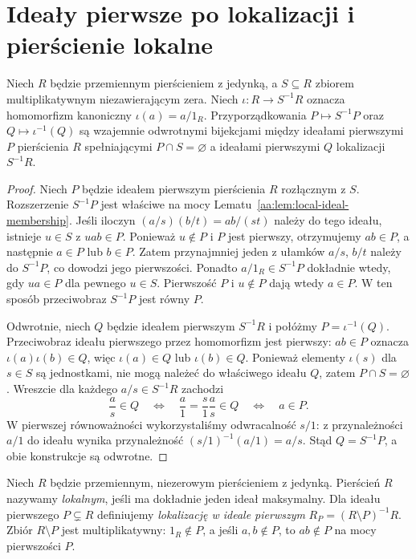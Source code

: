 \section{Ideały pierwsze po lokalizacji i pierścienie lokalne}
\begin{twierdzenie}
\label{aa:tw:prime-local-correspondence}
Niech $R$ będzie przemiennym pierścieniem z jedynką,
a $S\subseteq R$ zbiorem multiplikatywnym niezawierającym zera.
Niech $\iota:R\to S^{-1}R$ oznacza homomorfizm
kanoniczny $\iota(a)=a/1_R$. Przyporządkowania
$P\mapsto S^{-1}P$ oraz $Q\mapsto\iota^{-1}(Q)$
są wzajemnie odwrotnymi
bijekcjami między ideałami pierwszymi $P$ pierścienia $R$
spełniającymi $P\cap S=\varnothing$ a ideałami
pierwszymi $Q$ lokalizacji $S^{-1}R$.
\end{twierdzenie}
\begin{proof}
Niech $P$ będzie ideałem pierwszym pierścienia $R$
rozłącznym z $S$. Rozszerzenie $S^{-1}P$ jest właściwe
na mocy Lematu~\ref{aa:lem:local-ideal-membership}.
Jeśli iloczyn $(a/s)(b/t)=ab/(st)$ należy do tego
ideału, istnieje $u\in S$ z $uab\in P$.
Ponieważ $u\notin P$ i $P$ jest pierwszy, otrzymujemy
$ab\in P$, a następnie $a\in P$ lub $b\in P$.
Zatem przynajmniej jeden z ułamków $a/s$, $b/t$
należy do $S^{-1}P$, co dowodzi jego pierwszości.
Ponadto $a/1_R\in S^{-1}P$ dokładnie wtedy,
gdy $ua\in P$ dla pewnego $u\in S$.
Pierwszość $P$ i $u\notin P$ dają wtedy $a\in P$.
W ten sposób przeciwobraz $S^{-1}P$ jest równy $P$.

Odwrotnie, niech $Q$ będzie ideałem pierwszym $S^{-1}R$
i połóżmy $P=\iota^{-1}(Q)$. Przeciwobraz ideału
pierwszego przez homomorfizm jest pierwszy:
$ab\in P$ oznacza $\iota(a)\iota(b)\in Q$, więc
$\iota(a)\in Q$ lub $\iota(b)\in Q$.
Ponieważ elementy $\iota(s)$ dla $s\in S$ są jednostkami,
nie mogą należeć do właściwego ideału $Q$, zatem
$P\cap S=\varnothing$.
Wreszcie dla każdego $a/s\in S^{-1}R$ zachodzi
\[
 \frac as\in Q
 \quad\Longleftrightarrow\quad
 \frac a1=\frac s1\frac as\in Q
 \quad\Longleftrightarrow\quad a\in P.
\]
W pierwszej równoważności wykorzystaliśmy odwracalność
$s/1$: z przynależności $a/1$ do ideału wynika
przynależność $(s/1)^{-1}(a/1)=a/s$.
Stąd $Q=S^{-1}P$, a obie konstrukcje są odwrotne.
\end{proof}

\begin{definicja}
\label{aa:def:local-ring}
Niech $R$ będzie przemiennym, niezerowym pierścieniem
z jedynką. Pierścień $R$ nazywamy \emph{lokalnym},
jeśli ma dokładnie jeden ideał maksymalny.
Dla ideału pierwszego $P\subsetneq R$ definiujemy
\emph{lokalizację w ideale pierwszym}
$R_P=(R\setminus P)^{-1}R$.
Zbiór $R\setminus P$ jest multiplikatywny:
$1_R\notin P$, a jeśli $a,b\notin P$, to
$ab\notin P$ na mocy pierwszości $P$.
\end{definicja}

